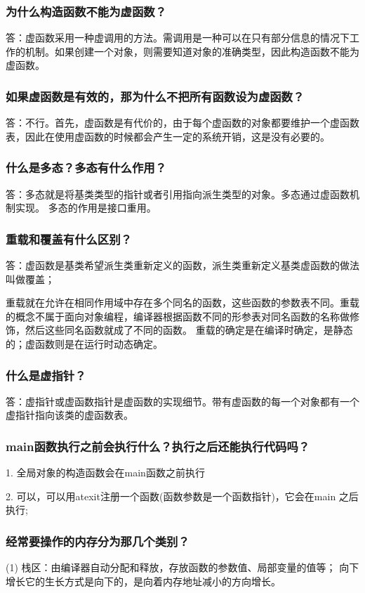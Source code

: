 \subsubsection{为什么构造函数不能为虚函数？}
答：虚函数采用一种虚调用的方法。需调用是一种可以在只有部分信息的情况下工作的机制。如果创建一个对象，则需要知道对象的准确类型，因此构造函数不能为虚函数。 \par

\subsubsection{如果虚函数是有效的，那为什么不把所有函数设为虚函数？}
答：不行。首先，虚函数是有代价的，由于每个虚函数的对象都要维护一个虚函数表，因此在使用虚函数的时候都会产生一定的系统开销，这是没有必要的。
\subsubsection{什么是多态？多态有什么作用？}
答：多态就是将基类类型的指针或者引用指向派生类型的对象。多态通过虚函数机制实现。
多态的作用是接口重用。
\subsubsection{重载和覆盖有什么区别？}
答：虚函数是基类希望派生类重新定义的函数，派生类重新定义基类虚函数的做法叫做覆盖；\par
重载就在允许在相同作用域中存在多个同名的函数，这些函数的参数表不同。重载的概念不属于面向对象编程，编译器根据函数不同的形参表对同名函数的名称做修饰，然后这些同名函数就成了不同的函数。
重载的确定是在编译时确定，是静态的；虚函数则是在运行时动态确定。
\subsubsection{什么是虚指针？}
答：虚指针或虚函数指针是虚函数的实现细节。带有虚函数的每一个对象都有一个虚指针指向该类的虚函数表。
\subsubsection{main函数执行之前会执行什么？执行之后还能执行代码吗？}
1. 全局对象的构造函数会在main函数之前执行 \par
2. 可以，可以用atexit注册一个函数(函数参数是一个函数指针)，它会在main 之后执行; \par
\subsubsection{经常要操作的内存分为那几个类别？}
(1) 栈区：由编译器自动分配和释放，存放函数的参数值、局部变量的值等； 向下增长它的生长方式是向下的，是向着内存地址减小的方向增长。

